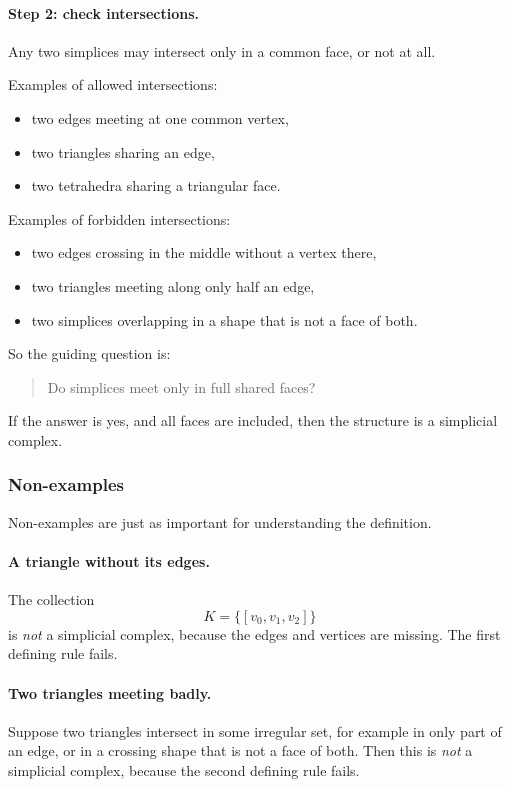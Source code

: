 \documentclass[12pt,a4paper]{article}
\theoremstyle{notespace}
\begin{document}
\paragraph{Step 2: check intersections.}
Any two simplices may intersect only in a common face, or not at all.

Examples of allowed intersections:
\begin{itemize}
	\item two edges meeting at one common vertex,
	\item two triangles sharing an edge,
	\item two tetrahedra sharing a triangular face.
\end{itemize}

Examples of forbidden intersections:
\begin{itemize}
	\item two edges crossing in the middle without a vertex there,
	\item two triangles meeting along only half an edge,
	\item two simplices overlapping in a shape that is not a face of both.
\end{itemize}

So the guiding question is:
\begin{quote}
	Do simplices meet only in full shared faces?
\end{quote}

If the answer is yes, and all faces are included, then the structure is a simplicial complex.

\subsubsection{Non-examples}

Non-examples are just as important for understanding the definition.

\paragraph{A triangle without its edges.}
The collection
\[
K=\{[v_0,v_1,v_2]\}
\]
is \emph{not} a simplicial complex, because the edges and vertices are missing. The first defining rule fails.

\paragraph{Two triangles meeting badly.}
Suppose two triangles intersect in some irregular set, for example in only part of an edge, or in a crossing shape that is not a face of both. Then this is \emph{not} a simplicial complex, because the second defining rule fails.
\end{document}
